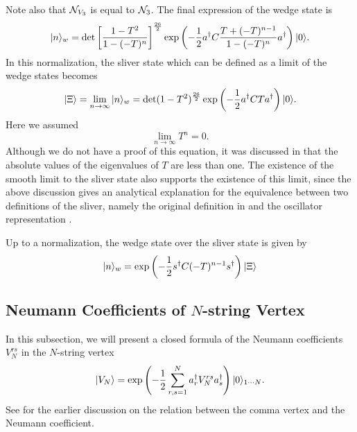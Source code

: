 \documentclass[a4paper,12pt]{article}
\def\N{{\cal N}}
\def\hf{{1\over 2}}
\def\o{\over}
\def\ket{\rangle}
\def\lf{\left}
\def\ri{\right}
\def\riya{\rightarrow}
\def\dag{\dagger}
\def\a{a^{\dag}}
\def\sd{s^{\dagger}}
\begin{document}
Note also that $\N_{V_3}$ is equal to $\N_3$. 
The final expression of the wedge state is
\begin{equation}
|n\ket_w=\det\lf[{1-T^2\o 1-(-T)^{n}}\ri]^{{26\o2}}
\exp\lf(-\hf\a C{T+(-T)^{n-1}\o 1-(-T)^{n}}\a\ri)|0\ket. 
\end{equation}
In this normalization, the sliver state which
can be defined as a limit of the wedge states \cite{RZ} becomes
\begin{equation}
|\Xi\ket=\lim_{n\riya\infty}|n\ket_w=\det(1-T^2)^{{26\o2}}
\exp\lf(-\hf\a CT\a\ri)|0\ket .
\end{equation}
Here we assumed
\begin{equation}
 \label{limT}
\lim_{n\riya\infty}T^{n}=0. 
\end{equation}
Although we do not have a  proof of this equation, 
it was discussed in \cite{KosteleckyPotting} that the absolute values 
of the eigenvalues of $T$ are less than one. 
The existence of the smooth limit to 
the sliver state \cite{RSZ1} also supports the existence of this limit,
since the above discussion gives
an analytical explanation for
the equivalence
between two definitions of the sliver,
namely the original definition in \cite{RZ} and
the oscillator representation \cite{KosteleckyPotting}.


Up to a normalization, the wedge state over the sliver state is given by
\begin{equation}
|n\ket_w=\exp\lf(-\hf\sd C(-T)^{n-1}\sd\ri)|\Xi\ket 
\end{equation}


\subsection{Neumann Coefficients of $N$-string Vertex}
In this subsection, we will present a closed formula 
of the Neumann coefficients $V^{rs}_N$ in the $N$-string vertex
\begin{equation}
|V_N\ket=\exp\lf(-\hf \sum_{r,s=1}^N\a_rV^{rs}_N\a_s\ri)|0\ket_{1\cdots N}.
\end{equation}
See \cite{CommaN} for the earlier discussion on the relation between 
the comma vertex and the Neumann coefficient.
\end{document}
